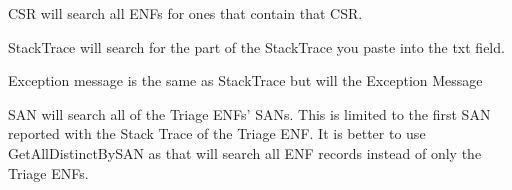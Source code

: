 \documentclass[a4paper,12pt]{report}
\begin{document}
 \par
{} \par
\begin{flushleft}
\item CSR will search all ENFs for ones that contain that CSR.\end{flushleft} \par
\begin{flushleft}\item StackTrace will search for the part of the StackTrace you paste into the txt field. \end{flushleft} \par
\begin{flushleft}\item Exception message is the same as StackTrace but will the Exception Message\end{flushleft} \par
\begin{flushleft}\item SAN will search all of the Triage ENFs' SANs. This is limited to the first SAN reported with the Stack Trace of the Triage ENF. It is better to use GetAllDistinctBySAN as that will search all ENF records instead of only the Triage ENFs.\end{flushleft} \par
\end{document}
